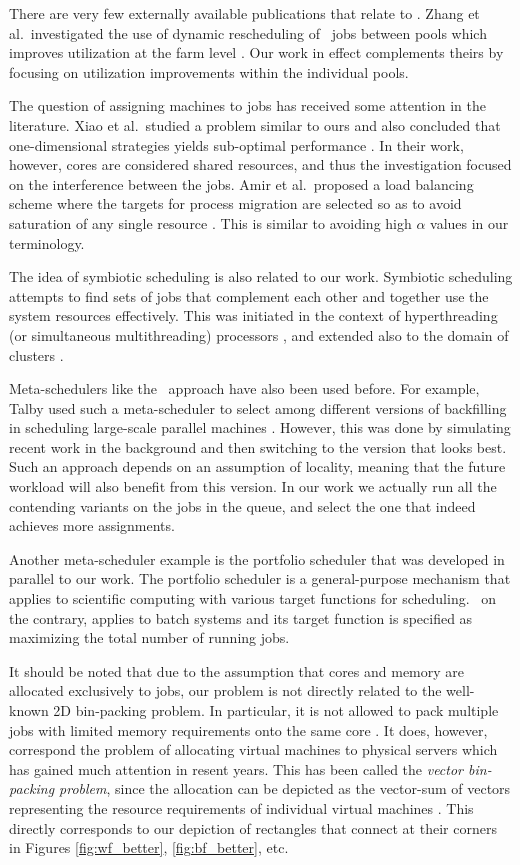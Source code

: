 There are very few externally available publications that relate to \nb.
Zhang et al.\ investigated the use of dynamic rescheduling of
\nb\ jobs between pools which improves utilization at the farm level
\cite{Zhang2010}.
Our work in effect complements theirs by focusing on utilization
improvements within the individual pools.

The question of assigning machines to jobs has received some attention
in the literature.
Xiao et al.\ studied a problem similar to ours and also concluded that
one-dimensional strategies yields sub-optimal performance
\cite{Xiao02dynamiccluster}.
In their work, however, cores are considered shared resources, and
thus the investigation focused on the interference between the jobs.
Amir et al.\ proposed a load balancing scheme where the targets for
process migration are selected so as to avoid saturation of any single
resource \cite{amir00}.
This is similar to avoiding high $\alpha$ values in our terminology.

The idea of symbiotic scheduling is also related to our work.
Symbiotic scheduling attempts to find sets of jobs that complement
each other and together use the system resources effectively.
This was initiated in the context of hyperthreading (or simultaneous
multithreading) processors \cite{snavely00,eyerman10},
and extended also to the domain of clusters \cite{weinberg06}.

Meta-schedulers like the \maj\ approach have also been used before.
For example, Talby used such a meta-scheduler to select among different
versions of backfilling in scheduling large-scale parallel machines
\cite{talby05}.
However, this was done by simulating recent work in the background and
then switching to the version that looks best.
Such an approach depends on an assumption of locality, meaning that
the future workload will also benefit from this version.
In our work we actually run all the contending variants on the jobs in
the queue, and select the one that indeed achieves more assignments.

Another meta-scheduler example is the portfolio scheduler
\cite{Deng1305Protfolio} that was developed in parallel to our work. The
portfolio scheduler is a general-purpose mechanism that applies
to scientific computing with various target functions for scheduling. \maj\ on
the contrary, applies to batch systems and its target function is specified as
maximizing the total number of running jobs.

It should be noted that due to the assumption that cores and memory
are allocated exclusively to jobs, our problem is not directly related
to the well-known 2D bin-packing problem.
In particular, it is not allowed to pack multiple jobs with limited
memory requirements onto the same core \cite{mishra11}. 
It does, however, correspond the problem of allocating virtual machines
to physical servers which has gained much attention in resent years.
This has been called the \emph{vector bin-packing problem}, since the
allocation can be depicted as the vector-sum of vectors representing
the resource requirements of individual virtual machines \cite{panigrahy11}.
This directly corresponds to our depiction of rectangles that connect
at their corners in Figures \ref{fig:wf_better}, \ref{fig:bf_better}, etc.


